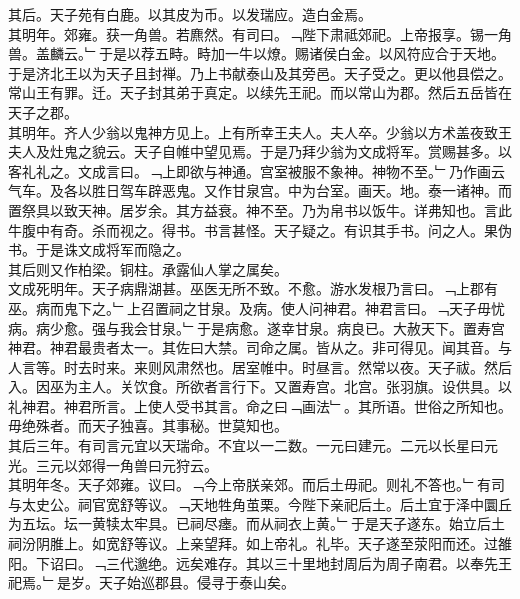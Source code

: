 \documentclass{zhvt-classic}
\begin{document}
\hspace*{2em}其后。天子苑有白鹿。以其皮为币。以发瑞应。造白金焉。\\
\hspace*{2em}其明年。郊雍。获一角兽。若麃然。有司曰。﹁陛下肃祗郊祀。上帝报享。锡一角兽。盖麟云。﹂于是以荐五畤。畤加一牛以燎。赐诸侯白金。以风符应合于天地。\\
\hspace*{2em}于是济北王以为天子且封禅。乃上书献泰山及其旁邑。天子受之。更以他县偿之。常山王有罪。迁。天子封其弟于真定。以续先王祀。而以常山为郡。然后五岳皆在天子之郡。\\
\hspace*{2em}其明年。齐人少翁以鬼神方见上。上有所幸王夫人。夫人卒。少翁以方术盖夜致王夫人及灶鬼之貌云。天子自帷中望见焉。于是乃拜少翁为文成将军。赏赐甚多。以客礼礼之。文成言曰。﹁上即欲与神通。宫室被服不象神。神物不至。﹂乃作画云气车。及各以胜日驾车辟恶鬼。又作甘泉宫。中为台室。画天。地。泰一诸神。而置祭具以致天神。居岁余。其方益衰。神不至。乃为帛书以饭牛。详弗知也。言此牛腹中有奇。杀而视之。得书。书言甚怪。天子疑之。有识其手书。问之人。果伪书。于是诛文成将军而隐之。\\
\hspace*{2em}其后则又作柏梁。铜柱。承露仙人掌之属矣。\\
\hspace*{2em}文成死明年。天子病鼎湖甚。巫医无所不致。不愈。游水发根乃言曰。﹁上郡有巫。病而鬼下之。﹂上召置祠之甘泉。及病。使人问神君。神君言曰。﹁天子毋忧病。病少愈。强与我会甘泉。﹂于是病愈。遂幸甘泉。病良已。大赦天下。置寿宫神君。神君最贵者太一。其佐曰大禁。司命之属。皆从之。非可得见。闻其音。与人言等。时去时来。来则风肃然也。居室帷中。时昼言。然常以夜。天子祓。然后入。因巫为主人。关饮食。所欲者言行下。又置寿宫。北宫。张羽旗。设供具。以礼神君。神君所言。上使人受书其言。命之曰﹁画法﹂。其所语。世俗之所知也。毋绝殊者。而天子独喜。其事秘。世莫知也。\\
\hspace*{2em}其后三年。有司言元宜以天瑞命。不宜以一二数。一元曰建元。二元以长星曰元光。三元以郊得一角兽曰元狩云。\\
\hspace*{2em}其明年冬。天子郊雍。议曰。﹁今上帝朕亲郊。而后土毋祀。则礼不答也。﹂有司与太史公。祠官宽舒等议。﹁天地牲角茧栗。今陛下亲祀后土。后土宜于泽中圜丘为五坛。坛一黄犊太牢具。已祠尽瘗。而从祠衣上黄。﹂于是天子遂东。始立后土祠汾阴脽上。如宽舒等议。上亲望拜。如上帝礼。礼毕。天子遂至荥阳而还。过雒阳。下诏曰。﹁三代邈绝。远矣难存。其以三十里地封周后为周子南君。以奉先王祀焉。﹂是岁。天子始巡郡县。侵寻于泰山矣。\\
\end{document}

